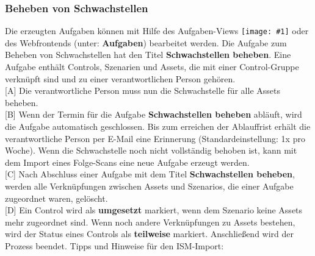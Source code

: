 \documentclass[a4paper,10pt]{book}
\newcommand{\icon}[1]{\texttt{[image: \#1]}}
\begin{document}
\subsubsection{Beheben von Schwachstellen}
Die erzeugten Aufgaben können mit Hilfe des Aufgaben-Views \icon{Icon/Tasks.png} oder des Webfrontends
(unter: \textbf{Aufgaben}) bearbeitet werden. Die Aufgabe zum Beheben von Schwachstellen hat den Titel \textbf{Schwachstellen beheben}. Eine Aufgabe enthält Controls, Szenarien und Assets, die mit einer Control-Gruppe verknüpft sind und zu einer verantwortlichen Person gehören.
\newline\\
{[}A{]} Die verantwortliche Person muss nun die Schwachstelle für alle Assets beheben.
\newline\\
{[}B{]} Wenn der Termin für die Aufgabe \textbf{Schwachstellen beheben} abläuft, wird die Aufgabe automatisch geschlossen. Bis zum erreichen der Ablauffrist
erhält die verantwortliche Person per E-Mail eine Erinnerung (Standardeinstellung: 1x pro Woche). Wenn die Schwachstelle noch nicht vollständig behoben ist, kann mit dem Import eines Folge-Scans eine neue Aufgabe erzeugt werden.
\newline\\
{[}C{]} Nach Abschluss einer Aufgabe mit dem Titel \textbf{Schwachstellen beheben}, werden alle Verknüpfungen zwischen
Assets und Szenarios, die einer Aufgabe zugeordnet waren, gelöscht.
\newline\\
{[}D{]} Ein Control wird als \textbf{umgesetzt} markiert, wenn dem Szenario keine Assets mehr zugeordnet sind. Wenn noch andere Verknüpfungen zu Assets bestehen, wird
der Status eines Controls als \textbf{teilweise} markiert. Anschließend wird der Prozess beendet.
Tipps und Hinweise für den ISM-Import:
\end{document}
